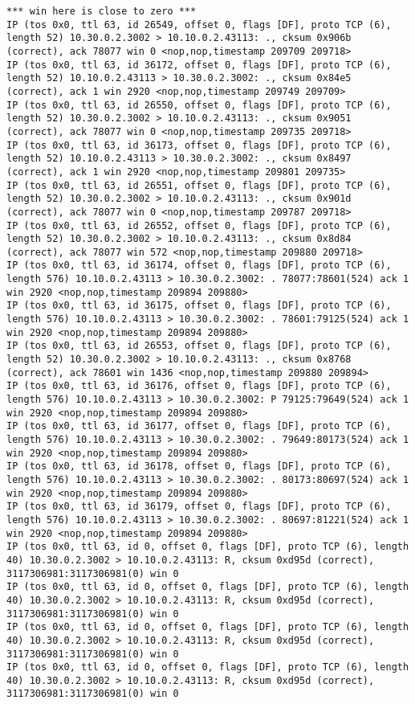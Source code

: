 \documentclass[a4paper,12pt]{article}
\begin{document}
\begin{lstlisting}
*** win here is close to zero ***
IP (tos 0x0, ttl 63, id 26549, offset 0, flags [DF], proto TCP (6), length 52) 10.30.0.2.3002 > 10.10.0.2.43113: ., cksum 0x906b (correct), ack 78077 win 0 <nop,nop,timestamp 209709 209718>
IP (tos 0x0, ttl 63, id 36172, offset 0, flags [DF], proto TCP (6), length 52) 10.10.0.2.43113 > 10.30.0.2.3002: ., cksum 0x84e5 (correct), ack 1 win 2920 <nop,nop,timestamp 209749 209709>
IP (tos 0x0, ttl 63, id 26550, offset 0, flags [DF], proto TCP (6), length 52) 10.30.0.2.3002 > 10.10.0.2.43113: ., cksum 0x9051 (correct), ack 78077 win 0 <nop,nop,timestamp 209735 209718>
IP (tos 0x0, ttl 63, id 36173, offset 0, flags [DF], proto TCP (6), length 52) 10.10.0.2.43113 > 10.30.0.2.3002: ., cksum 0x8497 (correct), ack 1 win 2920 <nop,nop,timestamp 209801 209735>
IP (tos 0x0, ttl 63, id 26551, offset 0, flags [DF], proto TCP (6), length 52) 10.30.0.2.3002 > 10.10.0.2.43113: ., cksum 0x901d (correct), ack 78077 win 0 <nop,nop,timestamp 209787 209718>
IP (tos 0x0, ttl 63, id 26552, offset 0, flags [DF], proto TCP (6), length 52) 10.30.0.2.3002 > 10.10.0.2.43113: ., cksum 0x8d84 (correct), ack 78077 win 572 <nop,nop,timestamp 209880 209718>
IP (tos 0x0, ttl 63, id 36174, offset 0, flags [DF], proto TCP (6), length 576) 10.10.0.2.43113 > 10.30.0.2.3002: . 78077:78601(524) ack 1 win 2920 <nop,nop,timestamp 209894 209880>
IP (tos 0x0, ttl 63, id 36175, offset 0, flags [DF], proto TCP (6), length 576) 10.10.0.2.43113 > 10.30.0.2.3002: . 78601:79125(524) ack 1 win 2920 <nop,nop,timestamp 209894 209880>
IP (tos 0x0, ttl 63, id 26553, offset 0, flags [DF], proto TCP (6), length 52) 10.30.0.2.3002 > 10.10.0.2.43113: ., cksum 0x8768 (correct), ack 78601 win 1436 <nop,nop,timestamp 209880 209894>
IP (tos 0x0, ttl 63, id 36176, offset 0, flags [DF], proto TCP (6), length 576) 10.10.0.2.43113 > 10.30.0.2.3002: P 79125:79649(524) ack 1 win 2920 <nop,nop,timestamp 209894 209880>
IP (tos 0x0, ttl 63, id 36177, offset 0, flags [DF], proto TCP (6), length 576) 10.10.0.2.43113 > 10.30.0.2.3002: . 79649:80173(524) ack 1 win 2920 <nop,nop,timestamp 209894 209880>
IP (tos 0x0, ttl 63, id 36178, offset 0, flags [DF], proto TCP (6), length 576) 10.10.0.2.43113 > 10.30.0.2.3002: . 80173:80697(524) ack 1 win 2920 <nop,nop,timestamp 209894 209880>
IP (tos 0x0, ttl 63, id 36179, offset 0, flags [DF], proto TCP (6), length 576) 10.10.0.2.43113 > 10.30.0.2.3002: . 80697:81221(524) ack 1 win 2920 <nop,nop,timestamp 209894 209880>
IP (tos 0x0, ttl 63, id 0, offset 0, flags [DF], proto TCP (6), length 40) 10.30.0.2.3002 > 10.10.0.2.43113: R, cksum 0xd95d (correct), 3117306981:3117306981(0) win 0
IP (tos 0x0, ttl 63, id 0, offset 0, flags [DF], proto TCP (6), length 40) 10.30.0.2.3002 > 10.10.0.2.43113: R, cksum 0xd95d (correct), 3117306981:3117306981(0) win 0
IP (tos 0x0, ttl 63, id 0, offset 0, flags [DF], proto TCP (6), length 40) 10.30.0.2.3002 > 10.10.0.2.43113: R, cksum 0xd95d (correct), 3117306981:3117306981(0) win 0
IP (tos 0x0, ttl 63, id 0, offset 0, flags [DF], proto TCP (6), length 40) 10.30.0.2.3002 > 10.10.0.2.43113: R, cksum 0xd95d (correct), 3117306981:3117306981(0) win 0


\end{lstlisting}
\end{document}
